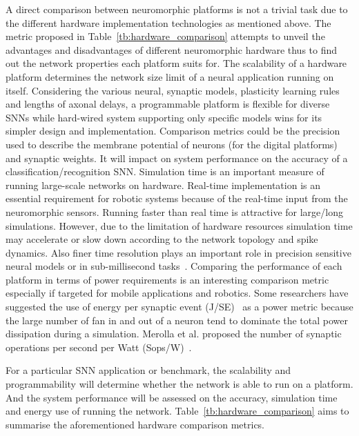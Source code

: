 A direct comparison between neuromorphic platforms is not a trivial task due to the different hardware implementation technologies as mentioned above.
The metric proposed in Table~\ref{tb:hardware_comparison} attempts to unveil the advantages and disadvantages of different neuromorphic hardware thus to find out the network properties each platform suits for.
The scalability of a hardware platform determines the network size limit of a neural application running on itself.
Considering the various neural, synaptic models, plasticity learning rules and lengths of axonal delays, a programmable platform is flexible for diverse SNNs while hard-wired system supporting only specific models wins for its simpler design and implementation.
Comparison metrics could be the precision used to describe the membrane potential of neurons (for the digital platforms) and synaptic weights.
It will impact on system performance on the accuracy of a classification/recognition SNN.
Simulation time is an important measure of running large-scale networks on hardware.
Real-time implementation is an essential requirement for robotic systems because of the real-time input from the neuromorphic sensors.
Running faster than real time is attractive for large/long simulations.
However, due to the limitation of hardware resources simulation time may accelerate or slow down according to the network topology and spike dynamics.
Also finer time resolution plays an important role in precision sensitive neural models or in sub-millisecond tasks~\citep{lagorce2015breaking}.
Comparing the performance of each platform in terms of power requirements is an interesting comparison metric especially if targeted for mobile applications and robotics. Some researchers have suggested the use of energy per synaptic event (J/SE)~\citep{sharp2012power,stromatias2013power} as a power metric because the large number of fan in and out of a neuron tend to dominate the total power dissipation during a simulation. Merolla et al. proposed the number of synaptic operations per second per Watt (Sops/W)~\citep{merolla2014million}. 

For a particular SNN application or benchmark, the scalability and programmability will determine whether the network is able to run on a platform.
And the system performance will be assessed on the accuracy, simulation time and energy use of running the network. 
Table~\ref{tb:hardware_comparison} aims to summarise the aforementioned hardware comparison metrics.
 
